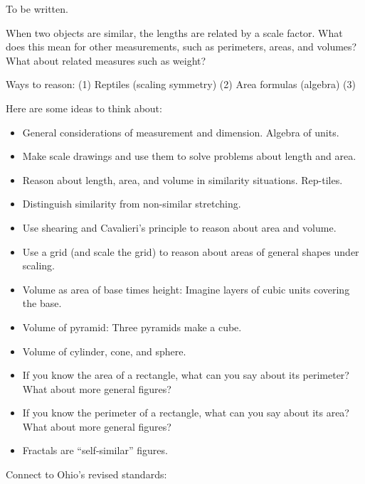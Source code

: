 To be written. 


\begin{teachingnote}
When two objects are similar, the lengths are related by a scale factor.  What does this mean for other measurements, such as perimeters, areas, and volumes?  What about related measures such as weight?  

Ways to reason: 
(1) Reptiles (scaling symmetry)
(2) Area formulas (algebra)
(3) 

Here are some ideas to think about:  

\begin{itemize}\itemsep-2pt
\item General considerations of measurement and dimension.  Algebra of units.  
\item Make scale drawings and use them to solve problems about length and area.  
\item Reason about length, area, and volume in similarity situations.  Rep-tiles.    
\item Distinguish similarity from non-similar stretching.  
\item Use shearing and Cavalieri's principle to reason about area and volume.  
\item Use a grid (and scale the grid) to reason about areas of general shapes under scaling.  
\item Volume as area of base times height:  Imagine layers of cubic units covering the base.
\item Volume of pyramid:  Three pyramids make a cube.  
\item Volume of cylinder, cone, and sphere.
\item If you know the area of a rectangle, what can you say about its perimeter?  What about more general figures?  
\item If you know the perimeter of a rectangle, what can you say about its area?  What about more general figures?  
\item Fractals are ``self-similar'' figures.  
\end{itemize}

Connect to Ohio's revised standards: 


\end{teachingnote}
